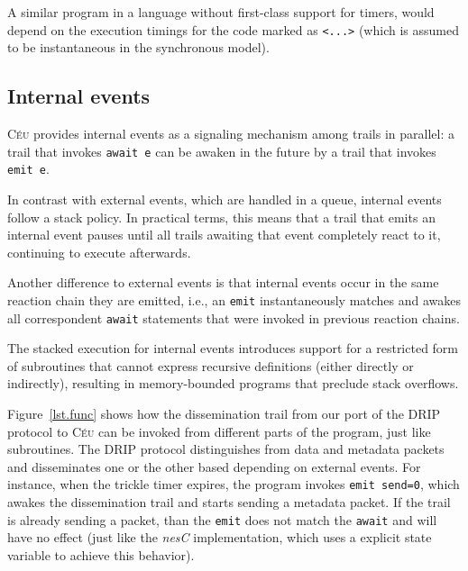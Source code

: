\documentclass[10pt]{sensys-proc}
\newcommand{\CEU}{\textsc{C\'{e}u}\xspace}
\newcommand{\code}[1] {{\small{\texttt{#1}}}}
\begin{document}
A similar program in a language without first-class support for timers, would 
depend on the execution timings for the code marked as \code{<...>} (which is 
assumed to be instantaneous in the synchronous model).



\subsection{Internal events}
\label{sec.ceu.ints}

\CEU provides internal events as a signaling mechanism among trails in 
parallel:
a trail that invokes \code{await~e} can be awaken in the future by a trail that 
invokes \code{emit~e}.

In contrast with external events, which are handled in a queue, internal events 
follow a stack policy.
In practical terms, this means that a trail that emits an internal event pauses 
until all trails awaiting that event completely react to it, continuing to 
execute afterwards.

Another difference to external events is that internal events occur in the same 
reaction chain they are emitted, i.e., an \code{emit} instantaneously matches 
and awakes all correspondent \code{await} statements that were invoked in 
previous reaction chains.

The stacked execution for internal events introduces support for a restricted 
form of subroutines that cannot express recursive definitions (either directly 
or indirectly), resulting in memory-bounded programs that preclude stack 
overflows.

Figure~\ref{lst.func} shows how the dissemination trail from our port of the 
DRIP protocol to \CEU can be invoked from different parts of the program, just 
like subroutines.
The DRIP protocol distinguishes from data and metadata packets and disseminates 
one or the other based depending on external events.
For instance, when the trickle timer expires, the program invokes 
\code{emit~send=0}, which awakes the dissemination trail and starts sending a 
metadata packet.
If the trail is already sending a packet, than the \code{emit} does not match 
the \code{await} and will have no effect (just like the \emph{nesC} 
implementation, which uses a explicit state variable to achieve this behavior).

\end{document}
